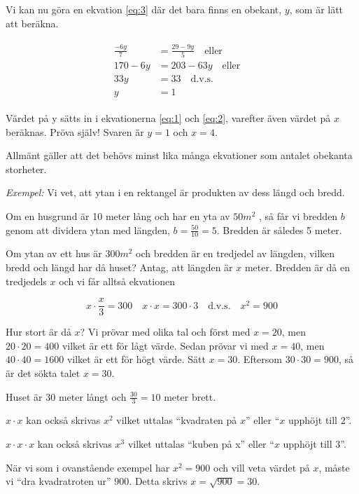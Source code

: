 Vi kan nu göra en ekvation \ref{eq:3} där det bara finns en obekant, \(y\),
som är lätt att beräkna.

\begin{align}
  \begin{split}
    \label{eq:3}
    \frac{ - 6y}{7} &= \frac{29 - 9y}{5}
    \quad \text{eller} \\
    170 - 6y &= 203-63y
    \quad \text{eller} \quad \\
    33y &= 33
    \quad \text{d.v.s.} \quad \\
    y &= 1
  \end{split}
\end{align}

Värdet på y sätts in i ekvationerna \ref{eq:1} och \ref{eq:2}, varefter även
värdet på \(x\) beräknas.
Pröva själv! Svaren är \(y = 1\) och \(x = 4\).

Allmänt gäller att det behövs minst lika många ekvationer som antalet obekanta
storheter.

\emph{Exempel:}
Vi vet, att ytan i en rektangel är produkten av dess längd och bredd.

Om en husgrund är 10 meter lång och har en yta av \(50 m^2\) , så får vi bredden
\(b\) genom att dividera ytan med längden, \(b = \frac{50}{10} = 5\).
Bredden är således 5 meter.

Om ytan av ett hus är \(300 m^2\) och bredden är en tredjedel av längden, vilken
bredd och längd har då huset?
Antag, att längden är \(x\) meter. Bredden är då en tredjedels \(x\) och vi får
alltså ekvationen

\[
x \cdot \frac{x}{3} = 300 \quad
x \cdot x = 300 \cdot 3 \quad \text{d.v.s.}
\quad x^2 = 900
\]

Hur stort är då \(x\)?
Vi prövar med olika tal och först med \(x = 20\), men \(20 \cdot 20 = 400\) vilket
är ett för lågt värde. Sedan prövar vi med \(x = 40\), men \(40 \cdot 40 = 1600\)
vilket är ett för högt värde. Sätt \(x = 30\). Eftersom \(30 \cdot 30 = 900\), så är
det sökta talet \(x = 30\).

Huset är 30 meter långt och \(\frac{30}{3} = 10\) meter brett.

\(x \cdot x\) kan också skrivas \(x^2\) vilket uttalas ``kvadraten på \(x\)'' eller
``\(x\) upphöjt till 2''.

\(x \cdot x \cdot x\) kan också skrivas \(x^3\) vilket uttalas ``kuben på x'' eller
``\(x\) upphöjt till 3''.

När vi som i ovanstående exempel har \(x^2 = 900\) och vill veta värdet på \(x\),
måste vi ``dra kvadratroten ur'' \(900\).
Detta skrivs \(x = \sqrt{900} = 30\).


